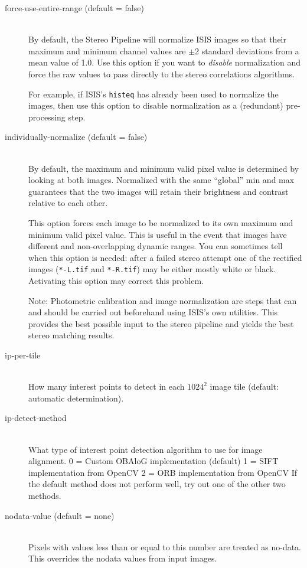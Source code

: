 \begin{description}
\item[force-use-entire-range \textnormal (default = false)] \hfill \\
  By default, the Stereo Pipeline will normalize ISIS images so that
  their maximum and minimum channel values are $\pm$2 standard
  deviations from a mean value of 1.0.  Use this option if you want to
  {\em disable} normalization and force the raw
  values to pass directly to the stereo correlations algorithms.

  For example, if ISIS's \texttt{histeq} has already been used to
  normalize the images, then use this option to disable normalization
  as a (redundant) pre-processing step.


\item[individually-normalize \textnormal (default = false)] \hfill \\
  By default, the maximum and minimum valid pixel value is determined
  by looking at both images.  Normalized with the same ``global'' min
  and max guarantees that the two images will retain their brightness
  and contrast relative to each other.

  This option forces each image to be normalized to its own maximum
  and minimum valid pixel value. This is useful in the event that
  images have different and non-overlapping dynamic ranges. You can
  sometimes tell when this option is needed: after a failed stereo
  attempt one of the rectified images (\texttt{*-L.tif} and
  \texttt{*-R.tif}) may be either mostly white or black.  Activating
  this option may correct this problem.

  Note: Photometric calibration and image normalization are steps that
  can and should be carried out beforehand using ISIS's own utilities.
  This provides the best possible input to the stereo pipeline and
  yields the best stereo matching results.

\item[ip-per-tile]  \hfill \\
How many interest points to detect in each $1024^2$ image tile (default: automatic
determination).

\item[ip-detect-method]  \hfill \\
What type of interest point detection algorithm to use for image alignment.
0 = Custom OBAloG implementation (default)
1 = SIFT implementation from OpenCV
2 = ORB implementation from OpenCV
If the default method does not perform well, try out one of the other two methods.

\item[nodata-value \textnormal (default = none)] \hfill \\
  Pixels with values less than or equal to this number are treated as
  no-data. This overrides the nodata values from input images.

\end{description}

